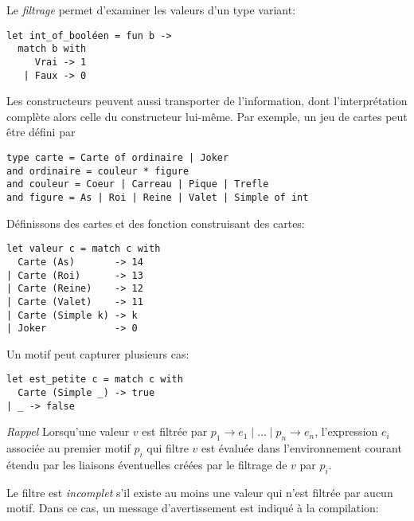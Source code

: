 Le \emph{filtrage} permet d'examiner les valeurs d'un type variant:
{\small
\begin{verbatim}
let int_of_booléen = fun b ->
  match b with
     Vrai -> 1 
   | Faux -> 0
\end{verbatim}
}

Les constructeurs peuvent aussi transporter de l'information, dont
l'interprétation complète alors celle du constructeur lui-même. Par
exemple, un jeu de cartes peut être défini par
{\small
\begin{verbatim}
type carte = Carte of ordinaire | Joker
and ordinaire = couleur * figure
and couleur = Coeur | Carreau | Pique | Trefle
and figure = As | Roi | Reine | Valet | Simple of int
\end{verbatim}
}

Définissons des cartes et des fonction construisant des cartes:

\bigskip







{\small
\begin{verbatim}
let valeur c = match c with
  Carte (As)       -> 14
| Carte (Roi)      -> 13
| Carte (Reine)    -> 12
| Carte (Valet)    -> 11
| Carte (Simple k) -> k
| Joker            -> 0
\end{verbatim}
}

Un motif peut capturer plusieurs cas:
{\small
\begin{verbatim}
let est_petite c = match c with
  Carte (Simple _) -> true
| _ -> false
\end{verbatim}
}


\noindent \emph{Rappel} Lorsqu'une valeur $v$ est filtrée par $p_1
\rightarrow e_1 \mid \ldots \mid p_n \rightarrow e_n$, l'expression
$e_i$ associée au premier motif $p_i$ qui filtre $v$ est évaluée dans
l'environnement courant étendu par les liaisons éventuelles créées par
le filtrage de $v$ par $p_i$.

Le filtre est \emph{incomplet} s'il existe au moins une valeur qui n'est
filtrée par aucun motif. Dans ce cas, un message d'avertissement est
indiqué à la compilation:


